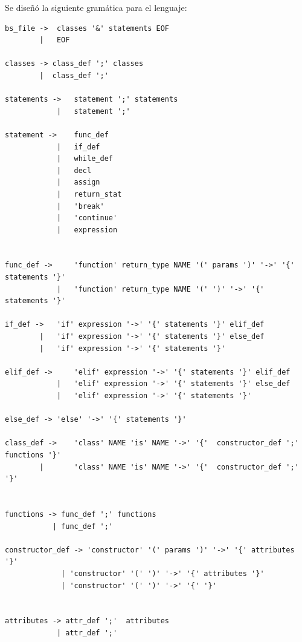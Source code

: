 Se diseñó la siguiente gramática para el lenguaje:

\begin{verbatim}
bs_file ->  classes '&' statements EOF     
        |   EOF                       

classes -> class_def ';' classes         
        |  class_def ';'                       

statements ->   statement ';' statements      
            |   statement ';'                      

statement ->    func_def
            |   if_def
            |   while_def
            |   decl 
            |   assign 
            |   return_stat 
            |   'break'                            
            |   'continue'                         
            |   expression


func_def ->     'function' return_type NAME '(' params ')' '->' '{' statements '}'       
            |   'function' return_type NAME '(' ')' '->' '{' statements '}'              

if_def ->   'if' expression '->' '{' statements '}' elif_def                             
        |   'if' expression '->' '{' statements '}' else_def                             
        |   'if' expression '->' '{' statements '}'                                      

elif_def ->     'elif' expression '->' '{' statements '}' elif_def                       
            |   'elif' expression '->' '{' statements '}' else_def                       
            |   'elif' expression '->' '{' statements '}'                                

else_def -> 'else' '->' '{' statements '}'                                               

class_def ->    'class' NAME 'is' NAME '->' '{'  constructor_def ';' functions '}'   
        |       'class' NAME 'is' NAME '->' '{'  constructor_def ';' '}'                     


functions -> func_def ';' functions                     
           | func_def ';'                               

constructor_def -> 'constructor' '(' params ')' '->' '{' attributes '}'              
             | 'constructor' '(' ')' '->' '{' attributes '}'                 
             | 'constructor' '(' ')' '->' '{' '}'                        


attributes -> attr_def ';'  attributes             
            | attr_def ';'                        


\end{verbatim}
